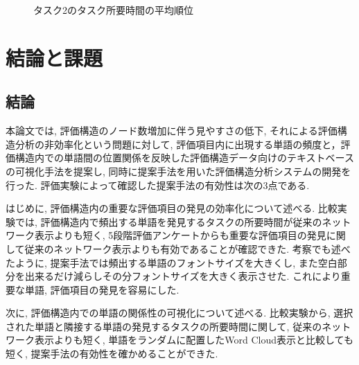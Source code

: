 \documentclass[syuuron]{kuee}
\begin{document}
		\begin{figure}
			\begin{center}
			\end{center}
			\caption{タスク2のタスク所要時間の平均順位}
	  		\label{fig:res10}
		\end{figure}

\chapter{結論と課題}
	\section{結論}
		本論文では, 評価構造のノード数増加に伴う見やすさの低下, それによる評価構造分析の非効率化という問題に対して, 
		評価項目内に出現する単語の頻度と，評価構造内での単語間の位置関係を反映した評価構造データ向けのテキストベースの可視化手法を提案し, 
		同時に提案手法を用いた評価構造分析システムの開発を行った. 
		評価実験によって確認した提案手法の有効性は次の3点である. 
		
		はじめに, 評価構造内の重要な評価項目の発見の効率化について述べる. 
		比較実験では, 評価構造内で頻出する単語を発見するタスクの所要時間が従来のネットワーク表示よりも短く, 
		5段階評価アンケートからも重要な評価項目の発見に関して従来のネットワーク表示よりも有効であることが確認できた. 
		考察でも述べたように, 提案手法では頻出する単語のフォントサイズを大きくし, また空白部分を出来るだけ減らしその分フォントサイズを大きく表示させた. 
		これにより重要な単語, 評価項目の発見を容易にした. 
		
		次に, 評価構造内での単語の関係性の可視化について述べる. 
		比較実験から, 選択された単語と隣接する単語の発見するタスクの所要時間に関して, 従来のネットワーク表示よりも短く, 
		単語をランダムに配置したWord Cloud表示と比較しても短く, 提案手法の有効性を確かめることができた. 
		
\end{document}
